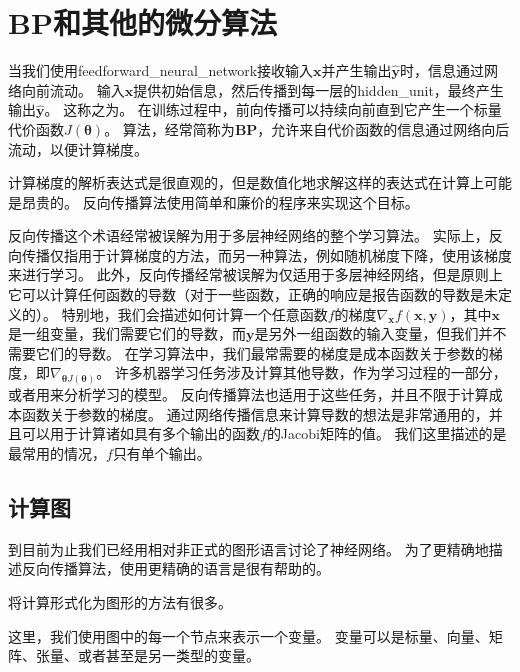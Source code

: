 
\section{\gls{BP}和其他的微分算法}
\label{sec:back_propagation_and_other_differentiation_algorithms}

当我们使用\gls{feedforward_neural_network}接收输入$\bm{x}$并产生输出$\hat{\bm{y}}$时，信息通过网络向前流动。
输入$\bm{x}$提供初始信息，然后传播到每一层的\gls{hidden_unit}，最终产生输出$\hat{\bm{y}}$。
这称之为。
在训练过程中，前向传播可以持续向前直到它产生一个标量代价函数$J(\bm{\theta})$。
算法\citep{RHW}，经常简称为\textbf{\glsdesc{BP}}，允许来自代价函数的信息通过网络向后流动，以便计算梯度。


计算梯度的解析表达式是很直观的，但是数值化地求解这样的表达式在计算上可能是昂贵的。
 反向传播算法使用简单和廉价的程序来实现这个目标。

反向传播这个术语经常被误解为用于多层神经网络的整个学习算法。
实际上，反向传播仅指用于计算梯度的方法，而另一种算法，例如随机梯度下降，使用该梯度来进行学习。
此外，反向传播经常被误解为仅适用于多层神经网络，但是原则上它可以计算任何函数的导数（对于一些函数，正确的响应是报告函数的导数是未定义的）。
特别地，我们会描述如何计算一个任意函数$f$的梯度$\nabla_{\bm{x}} f(\bm{x}, \bm{y})$，其中$\bm{x}$是一组变量，我们需要它们的导数，而$\bm{y}$是另外一组函数的输入变量，但我们并不需要它们的导数。
在学习算法中，我们最常需要的梯度是成本函数关于参数的梯度，即$\nabla_{\bm{\theta}J(\bm{\theta})}$。
许多机器学习任务涉及计算其他导数，作为学习过程的一部分，或者用来分析学习的模型。
反向传播算法也适用于这些任务，并且不限于计算成本函数关于参数的梯度。
通过网络传播信息来计算导数的想法是非常通用的，并且可以用于计算诸如具有多个输出的函数$f$的Jacobi矩阵的值。
我们这里描述的是最常用的情况，$f$只有单个输出。

\subsection{计算图}
\label{sec:computational_graphs}

到目前为止我们已经用相对非正式的图形语言讨论了神经网络。
为了更精确地描述反向传播算法，使用更精确的语言是很有帮助的。

将计算形式化为图形的方法有很多。

这里，我们使用图中的每一个节点来表示一个变量。
变量可以是标量、向量、矩阵、张量、或者甚至是另一类型的变量。

